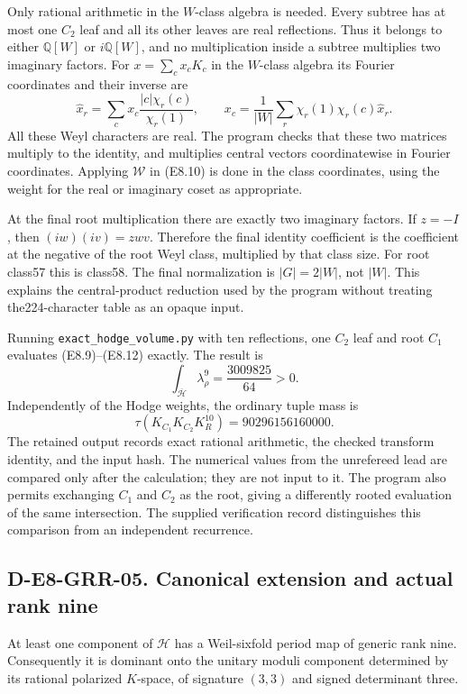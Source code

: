 Only rational arithmetic in the $W$-class algebra is needed.
Every subtree has at most one $C_2$ leaf and all its other leaves
are real reflections.  Thus it belongs to either $\mathbb Q[W]$
or $i\mathbb Q[W]$, and no multiplication inside a subtree
multiplies two imaginary factors.  For $x=\sum_cx_cK_c$ in the
$W$-class algebra its Fourier coordinates and their inverse are
\[
 \widehat x_r=\sum_cx_c\frac{|c|\chi_r(c)}{\chi_r(1)},\qquad
 x_c=\frac1{|W|}\sum_r\chi_r(1)\chi_r(c)\widehat x_r.          \tag{E8.18}
\]
All these Weyl characters are real.  The program checks that
these two matrices multiply to the identity, and multiplies
central vectors coordinatewise in Fourier coordinates.  Applying
$\mathcal W$ in (E8.10) is done in the class coordinates, using the
weight for the real or imaginary coset as appropriate.

At the final root multiplication there are exactly two imaginary
factors.  If $z=-I$, then $(iw)(iv)=zwv$.  Therefore the final
identity coefficient is the coefficient at the negative of the
root Weyl class, multiplied by that class size.  For root class57
this is class58.  The final normalization is $|G|=2|W|$, not
$|W|$.  This explains the central-product reduction used by the
program without treating the224-character table as an opaque
input.

Running \texttt{exact\_hodge\_volume.py} with ten reflections,
one $C_2$ leaf and root $C_1$ evaluates (E8.9)--(E8.12) exactly.
The result is
\[
 \boxed{\int_{\overline{\mathcal H}}\lambda_\rho^9
                       =\frac{3009825}{64}>0.}                \tag{E8.19}
\]
Independently of the Hodge weights, the ordinary tuple mass is
\[
 \boxed{\tau(K_{C_1}K_{C_2}K_R^{10})=90296156160000.}          \tag{E8.20}
\]
The retained output records exact rational arithmetic, the checked
transform identity, and the input hash.  The numerical values
from the unrefereed lead are compared only after the calculation;
they are not input to it.  The program also permits exchanging
$C_1$ and $C_2$ as the root, giving a differently rooted evaluation
of the same intersection.  The supplied verification record
distinguishes this comparison from an independent recurrence.

\subsection*{D-E8-GRR-05. Canonical extension and actual rank nine}

At least one component of $\mathcal H$ has a Weil-sixfold period
map of generic rank nine.  Consequently it is dominant onto the
unitary moduli component determined by its rational polarized
$K$-space, of signature $(3,3)$ and signed determinant three.

